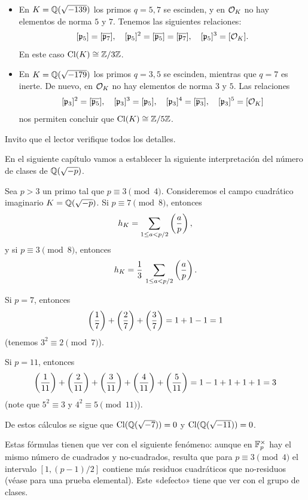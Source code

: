 \begin{ejemplo}
\begin{itemize}
  \item En $K = \mathbb{Q} (\sqrt{-139})$ los primos $q = 5, 7$ se escinden, y en
    $\mathcal{O}_K$ no hay elementos de norma $5$ y $7$. Tenemos las siguientes
    relaciones:
    \[ [\mathfrak{p}_5] = [\overline{\mathfrak{p}_7}], \quad
       [\mathfrak{p}_5]^2 = [\overline{\mathfrak{p}_5}] = [\overline{\mathfrak{p}_7}], \quad
       [\mathfrak{p}_5]^3 = [\mathcal{O}_K]. \]
    En este caso $\operatorname{Cl} (K) \cong \mathbb{Z}/3\mathbb{Z}$.
 
  \item En $K = \mathbb{Q} (\sqrt{-179})$ los primos $q = 3,5$ se escinden, mientras
    que $q = 7$ es inerte. De nuevo, en $\mathcal{O}_K$ no hay elementos de norma
    $3$ y $5$. Las relaciones
    \[ [\mathfrak{p}_3]^2 = [\overline{\mathfrak{p}_5}], \quad
       [\mathfrak{p}_3]^3 = [\mathfrak{p}_5], \quad
       [\mathfrak{p}_3]^4 = [\overline{\mathfrak{p}_3}], \quad
       [\mathfrak{p}_3]^5 = [\mathcal{O}_K] \]
    nos permiten concluir que $\operatorname{Cl} (K) \cong \mathbb{Z}/5\mathbb{Z}$.
  \end{itemize}

  Invito que el lector verifique todos los detalles.
\end{ejemplo}

En el siguiente capítulo vamos a establecer la siguiente interpretación
del número de clases de $\mathbb{Q} (\sqrt{-p})$.

\begin{teorema}[Dirichlet]
  Sea $p > 3$ un primo tal que $p \equiv 3 \pmod{4}$. Consideremos el campo
  cuadrático imaginario $K = \mathbb{Q} (\sqrt{-p})$. Si $p \equiv 7 \pmod{8}$,
  entonces
  $$h_K = \sum_{1 \le a < p/2} \left(\frac{a}{p}\right),$$
  y si $p \equiv 3 \pmod{8}$, entonces
  $$h_K = \frac{1}{3}\,\sum_{1 \le a < p/2} \left(\frac{a}{p}\right).$$
\end{teorema}

\begin{ejemplo}
  Si $p = 7$, entonces
  $$\left(\frac{1}{7}\right) + \left(\frac{2}{7}\right) + \left(\frac{3}{7}\right) = 1 + 1 - 1 = 1$$
  (tenemos $3^2 \equiv 2 \pmod{7}$).

  Si $p = 11$, entonces
  $$\left(\frac{1}{11}\right) + \left(\frac{2}{11}\right) + \left(\frac{3}{11}\right) + \left(\frac{4}{11}\right) + \left(\frac{5}{11}\right) = 1 - 1 + 1 + 1 + 1 = 3$$
  (note que $5^2 \equiv 3$ y $4^2 \equiv 5 \pmod{11}$).

  De estos cálculos se sigue que $\operatorname{Cl} (\mathbb{Q} (\sqrt{-7})) = 0$ y
  $\operatorname{Cl} (\mathbb{Q} (\sqrt{-11})) = 0$.
\end{ejemplo}

Estas fórmulas tienen que ver con el siguiente fenómeno: aunque en
$\mathbb{F}_p^\times$ hay el mismo número de cuadrados y no-cuadrados, resulta que
para $p \equiv 3 \pmod{4}$ el intervalo $[1, (p-1)/2]$ contiene más residuos
cuadráticos que no-residuos (véase \cite{Moser-1951} para una prueba
elemental). Este «defecto» tiene que ver con el grupo de clases.


